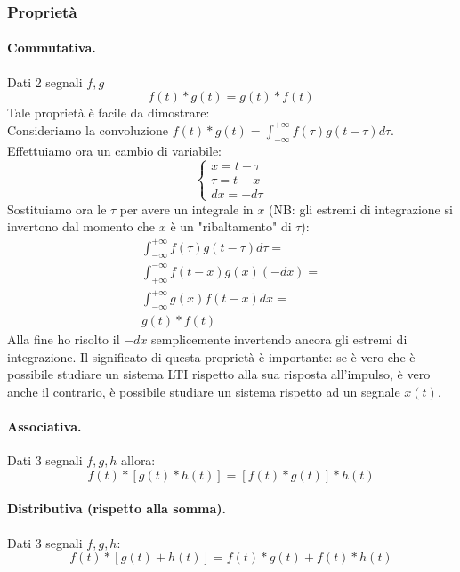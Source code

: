 \subsubsection{Proprietà}
\paragraph{Commutativa.}Dati 2 segnali $f,g$
\begin{equation} \label{prop: convComm}
    f(t) \ast g(t) = g(t) \ast f(t)
\end{equation}
Tale proprietà è facile da dimostrare:\\
Consideriamo la convoluzione $f(t) \ast g(t) = \int_{-\infty}^{+\infty} f(\tau)g(t - \tau) d\tau$. Effettuiamo ora un cambio di variabile:
\begin{equation*}
    \begin{cases}
        x = t - \tau\\
        \tau = t - x\\
        dx = -d\tau
    \end{cases}
\end{equation*}
Sostituiamo ora le $\tau$ per avere un integrale in $x$ (NB: gli estremi di integrazione si invertono dal momento che $x$ è un "ribaltamento" di $\tau$):
\begin{align*}
    \int_{-\infty}^{+\infty} f(\tau)g(t - \tau) d\tau= \\
    \int_{+\infty}^{-\infty} f(t - x)g(x) (-dx) = \\
    \int_{-\infty}^{+\infty} g(x)f(t - x) dx = \\
    g(t) \ast f(t)
\end{align*}
Alla fine ho risolto il $-dx$ semplicemente invertendo ancora gli estremi di integrazione. Il significato di questa proprietà è importante:
se è vero che è possibile studiare un sistema LTI rispetto alla sua risposta all'impulso, è vero anche il contrario, è possibile studiare un sistema rispetto ad un segnale $x(t)$.

\paragraph{Associativa.}Dati 3 segnali $f,g,h$ allora:
\begin{equation}
    f(t) \ast [g(t) \ast h(t)] = [f(t) \ast g(t)] \ast h(t)
\end{equation}

\paragraph{Distributiva (rispetto alla somma).}Dati 3 segnali $f,g,h$:
\begin{equation} \label{prop: ConvDistr}
    f(t) \ast [g(t) + h(t)] = f(t) \ast g(t) + f(t) \ast h(t) 
\end{equation}

